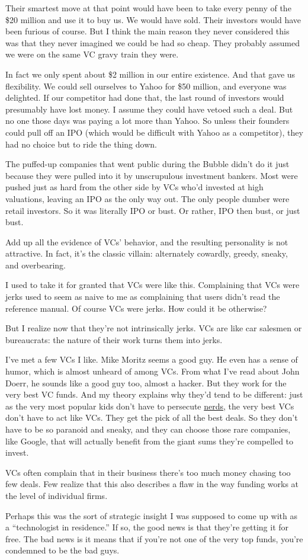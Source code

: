 Their smartest move at that point would have been to take every penny of
the \$20 million and use it to buy us. We would have sold. Their
investors would have been furious of course. But I think the main reason
they never considered this was that they never imagined we could be had
so cheap. They probably assumed we were on the same VC gravy train they
were.

In fact we only spent about \$2 million in our entire existence. And
that gave us flexibility. We could sell ourselves to Yahoo for \$50
million, and everyone was delighted. If our competitor had done that,
the last round of investors would presumably have lost money. I assume
they could have vetoed such a deal. But no one those days was paying a
lot more than Yahoo. So unless their founders could pull off an IPO
(which would be difficult with Yahoo as a competitor), they had no
choice but to ride the thing down.

The puffed-up companies that went public during the Bubble didn't do it
just because they were pulled into it by unscrupulous investment
bankers. Most were pushed just as hard from the other side by VCs who'd
invested at high valuations, leaving an IPO as the only way out. The
only people dumber were retail investors. So it was literally IPO or
bust. Or rather, IPO then bust, or just bust.

Add up all the evidence of VCs' behavior, and the resulting personality
is not attractive. In fact, it's the classic villain: alternately
cowardly, greedy, sneaky, and overbearing.

I used to take it for granted that VCs were like this. Complaining that
VCs were jerks used to seem as naive to me as complaining that users
didn't read the reference manual. Of course VCs were jerks. How could it
be otherwise?

But I realize now that they're not intrinsically jerks. VCs are like car
salesmen or bureaucrats: the nature of their work turns them into jerks.

I've met a few VCs I like. Mike Moritz seems a good guy. He even has a
sense of humor, which is almost unheard of among VCs. From what I've
read about John Doerr, he sounds like a good guy too, almost a hacker.
But they work for the very best VC funds. And my theory explains why
they'd tend to be different: just as the very most popular kids don't
have to persecute \href{nerds.html}{nerds}, the very best VCs don't have
to act like VCs. They get the pick of all the best deals. So they don't
have to be so paranoid and sneaky, and they can choose those rare
companies, like Google, that will actually benefit from the giant sums
they're compelled to invest.

VCs often complain that in their business there's too much money chasing
too few deals. Few realize that this also describes a flaw in the way
funding works at the level of individual firms.

Perhaps this was the sort of strategic insight I was supposed to come up
with as a ``technologist in residence.'' If so, the good news is that
they're getting it for free. The bad news is it means that if you're not
one of the very top funds, you're condemned to be the bad guys.